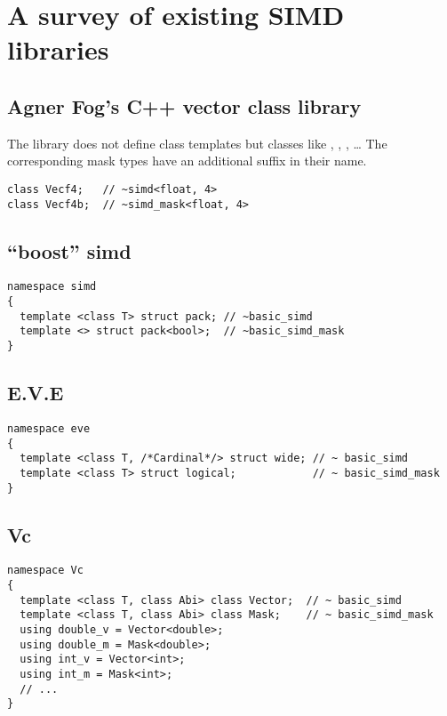 \pagestyle{scrheadings}




\section{A survey of existing SIMD libraries}

\subsection{Agner Fog's C++ vector class library}

The library does not define class templates but classes like , ,
, \ldots
The corresponding mask types have an additional  suffix in their name.

\medskip\begin{lstlisting}
class Vecf4;   // ~simd<float, 4>
class Vecf4b;  // ~simd_mask<float, 4>
\end{lstlisting}


\subsection{“boost” simd}

\medskip\begin{lstlisting}
namespace simd
{
  template <class T> struct pack; // ~basic_simd
  template <> struct pack<bool>;  // ~basic_simd_mask
}
\end{lstlisting}

\subsection{E.V.E}

\medskip\begin{lstlisting}
namespace eve
{
  template <class T, /*Cardinal*/> struct wide; // ~ basic_simd
  template <class T> struct logical;            // ~ basic_simd_mask
}
\end{lstlisting}

\subsection{Vc}

\medskip\begin{lstlisting}
namespace Vc
{
  template <class T, class Abi> class Vector;  // ~ basic_simd
  template <class T, class Abi> class Mask;    // ~ basic_simd_mask
  using double_v = Vector<double>;
  using double_m = Mask<double>;
  using int_v = Vector<int>;
  using int_m = Mask<int>;
  // ...
}
\end{lstlisting}

